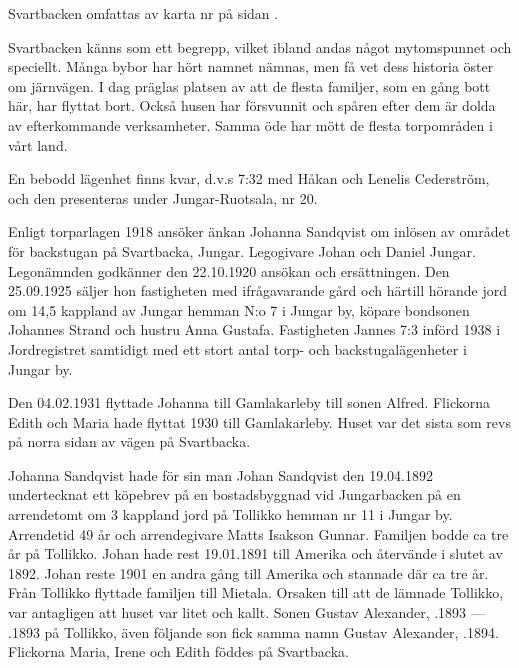%

Svartbacken omfattas av karta nr  på sidan \pageref{map:13}.




%



Svartbacken känns som ett begrepp, vilket ibland andas något mytomspunnet och speciellt. Många bybor har hört namnet nämnas, men få vet dess historia öster om järnvägen. I dag präglas platsen av att de flesta familjer, som en gång bott här, har flyttat bort. Också husen har försvunnit och spåren efter dem är dolda av efterkommande verksamheter. Samma öde har mött de flesta torpområden i vårt land.

En bebodd lägenhet finns kvar, d.v.s  7:32 med Håkan och Lenelis Cederström, och den presenteras under Jungar-Ruotsala, nr 20.



%


%
Enligt torparlagen 1918 ansöker änkan Johanna Sandqvist om inlösen av området för backstugan på Svartbacka, Jungar. Legogivare Johan och Daniel Jungar. Legonämnden godkänner den 22.10.1920 ansökan och ersättningen. Den 25.09.1925 säljer hon fastigheten med ifrågavarande gård och härtill hörande jord om 14,5 kappland av Jungar hemman N:o 7 i Jungar by, köpare  bondsonen Johannes Strand och hustru Anna Gustafa. Fastigheten Jannes 7:3 införd 1938 i Jordregistret samtidigt med ett stort antal torp- och backstugalägenheter i Jungar by.

Den 04.02.1931 flyttade Johanna till Gamlakarleby till sonen Alfred. Flickorna Edith och Maria hade flyttat 1930 till Gamlakarleby. Huset var det sista som revs på norra sidan av vägen på Svartbacka.

Johanna Sandqvist hade för sin man Johan Sandqvist den 19.04.1892	undertecknat ett köpebrev på en bostadsbyggnad vid Jungarbacken på en arrendetomt om 3 kappland jord på Tollikko	hemman nr 11 i Jungar by. Arrendetid 49 år och arrendegivare Matts	Isakson Gunnar. Familjen bodde ca tre år på Tollikko. Johan hade rest	19.01.1891 till Amerika och återvände i slutet av 1892. Johan reste 1901 en andra gång till Amerika och stannade där ca tre år. Från Tollikko flyttade familjen till Mietala. Orsaken till att de lämnade Tollikko, var antagligen att huset var litet och kallt. Sonen Gustav Alexander, .1893  ---  .1893 på Tollikko, även följande son fick samma namn Gustav Alexander, .1894. Flickorna Maria, Irene och 	Edith föddes på Svartbacka.


